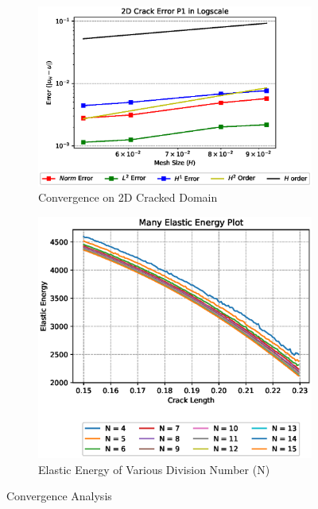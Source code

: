 \documentclass[a4paper,11pt]{article}
\begin{document}
\begin{figure}[h!]
	\begin{subfigure}[b]{0.49\linewidth}
		\centering
		\includegraphics[width=\linewidth]{picture/conference/crackerrp1case}
		\caption{Convergence on 2D Cracked Domain}
		\label{fig:all2dcrackerrorcase}
	\end{subfigure}
	\quad
	\begin{subfigure}[b]{0.49\linewidth}
		\centering
		\includegraphics[width=\linewidth]{picture/conference/manyelastic}
		\caption{Elastic Energy of Various Division Number (N)}
		\label{fig:manyelastic}
	\end{subfigure}
	\caption{Convergence Analysis}
	\label{fig:converganalysis}
\end{figure}
\newline
\newpage
\end{document}
